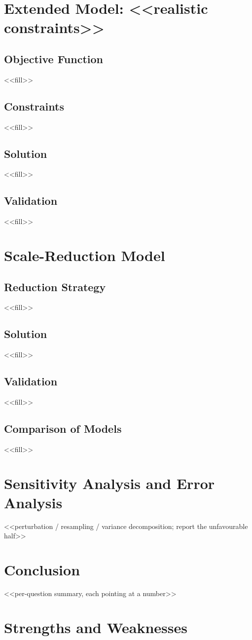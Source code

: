 \documentclass[<<options>>]{apmcmthesis}
\begin{document}
\section{Extended Model: <<realistic constraints>>}
\subsection{Objective Function}
<<fill>>
\subsection{Constraints}
<<fill>>
\subsection{Solution}
<<fill>>
\subsection{Validation}
<<fill>>
\section{Scale-Reduction Model}
\subsection{Reduction Strategy}
<<fill>>
\subsection{Solution}
<<fill>>
\subsection{Validation}
<<fill>>
\subsection{Comparison of Models}
<<fill>>
\section{Sensitivity Analysis and Error Analysis}
<<perturbation / resampling / variance decomposition; report the unfavourable half>>
\section{Conclusion}
<<per-question summary, each pointing at a number>>
\section{Strengths and Weaknesses}
\end{document}
